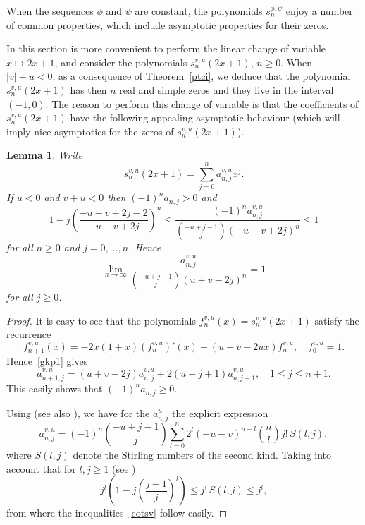 \documentclass[10pt, a4paper, leqno]{amsart}
\numberwithin{equation}{section}
\theoremstyle{plain}
\newtheorem{Lem}[Theo]{Lemma}
\theoremstyle{remark}
\newcommand{\spp}{s^{\phi,\psi}}
\newcommand{\scvu}{s^{v,u}}
\begin{document}
When the sequences $\phi$ and $\psi$ are constant, the polynomials $\spp_n$ enjoy a number of common properties, which include asymptotic properties for their zeros.

In this section is more convenient to perform the linear change of variable $x\mapsto 2x+1$, and
consider the polynomials $s_n^{v,u}(2x+1)$, $n\ge 0$. When $|v|+u<0$, as a consequence of Theorem~\ref{ptci}, we deduce that the polynomial $s_n^{v,u}(2x+1)$ has then $n$ real and simple zeros and they live in the interval $(-1,0)$. The reason to perform this change of variable is that the coefficients of $\scvu_n(2x+1)$ have the following appealing asymptotic behaviour (which will imply nice asymptotics for the zeros of $\scvu_n(2x+1)$).

\begin{Lem}
\label{l5.8}
Write
\begin{equation}
\label{coex}
  s_n^{v,u}(2x+1) = \sum_{j=0}^na_{n,j}^{v,u}x^j.
\end{equation}
If $u<0$ and $v+u<0$ then $(-1)^na_{n,j}>0$ and
\begin{equation}
\label{cotsv}
  1-j\left(\frac{-u-v+2j-2}{-u-v+2j}\right)^n
  \le \frac{(-1)^na_{n,j}^{v,u}}{\binom{-u+j-1}{j}(-u-v+2j)^n} \le 1
\end{equation}
for all $n\ge 0$ and $j=0,\dots, n$. Hence
\[
  \lim_{n\to \infty} \frac{a_{n,j}^{v,u}}{\binom{-u+j-1}{j}(u+v-2j)^n} = 1
\]
for all $j\ge 0$.
\end{Lem}

\begin{proof}
It is easy to see that the polynomials $f_n^{v,u}(x) = s_n^{v,u}(2x+1)$ satisfy the recurrence
\[
  f_{n+1}^{v,u}(x) = -2x(1+x)(f_n^{v,u})'(x)+(u+v+2ux)f_n^{v,u},
  \quad f_0^{v,u}=1.
\]
Hence~\eqref{gkp1} gives
\[
  a_{n+1,j}^{v,u} = (u+v-2j)a_{n,j}^{v,u}+2(u-j+1)a_{n,j-1}^{v,u},
  \quad 1\le j\le n+1.
\]
This easily shows that $(-1)^na_{n,j}\ge 0$.

Using \cite[Identity (2)]{Spi} (see also \cite{Neu}), we have for the $a_{n,j}^u$ the explicit expression
\begin{equation*}
  a_{n,j}^{v,u} = (-1)^n\binom{-u+j-1}{j} \sum_{l=0}^n 2^l(-u-v)^{n-l}\binom{n}{l}j!\,S(l,j),
\end{equation*}
where $S(l,j)$ denote the Stirling numbers of the second kind. Taking into account that for $l,j\ge 1$ (see \cite[p.~303]{Mez})
\[
  j^l\left(1-j\left(\frac{j-1}{j}\right)^l\right) \le j!\,S(l,j)\le j^l,
\]
from where the inequalities~\eqref{cotsv} follow easily.
\end{proof}
\end{document}
